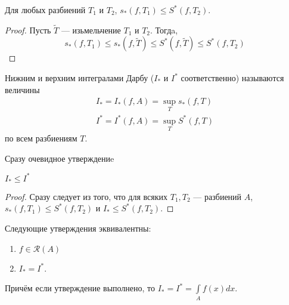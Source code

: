 \begin{Statement}
    Для любых разбиений $T_1$ и $T_2$, $s_*(f, T_1) \leqslant S^*(f, T_2)$.
\end{Statement}
\begin{proof}
    Пусть $\widetilde{T}$ --- изьмельчение $T_1$ и $T_2$. Тогдa,
    $$
        s_*(f, T_1) \leqslant s_*(f, \widetilde{T}) \leqslant S^*(f, \widetilde{T}) \leqslant S^*(f, T_2)
    $$
\end{proof}
\begin{Def}
    Нижним и верхним интегралами Дарбу ($I_*$ и $I^*$ соответственно) называются величины
    \begin{gather}
        I_* = I_*(f, A) = \sup_{T} s_*(f,T)\\
        I^* = I^*(f, A) = \sup_{T} S^*(f, T)
    \end{gather}
    по всем разбиениям $T$.
\end{Def}
Сразу очевидное утверждениe
\begin{Statement}
    $I_* \leqslant I^*$
\end{Statement}
\begin{proof}
    Сразу следует из того, что для всяких $T_1, T_2$ --- разбиений $A$, $s_*(f, T_1) \leqslant S^*(f, T_2)$ и $I_* \leqslant S^*(f, T_2)$.
\end{proof}
\begin{Theorem}
Следующие утверждения эквивалентны:
\begin{enumerate}
    \item $f \in \mathcal{R}(A)$
    \item $I_* = I^*$.
\end{enumerate}
Причём если утверждение выполнено, то $I_* = I^* = \int\limits_{A}f(x) dx$.
\end{Theorem}
